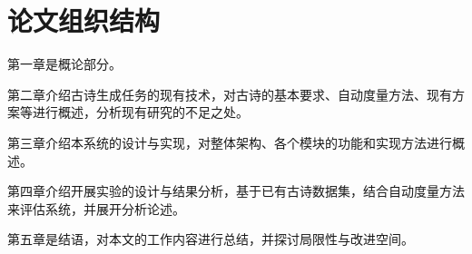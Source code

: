 \section{论文组织结构}

    第一章是概论部分。
    
    第二章介绍古诗生成任务的现有技术，对古诗的基本要求、自动度量方法、现有方案等进行概述，分析现有研究的不足之处。

    第三章介绍本系统的设计与实现，对整体架构、各个模块的功能和实现方法进行概述。

    第四章介绍开展实验的设计与结果分析，基于已有古诗数据集，结合自动度量方法来评估系统，并展开分析论述。

    第五章是结语，对本文的工作内容进行总结，并探讨局限性与改进空间。